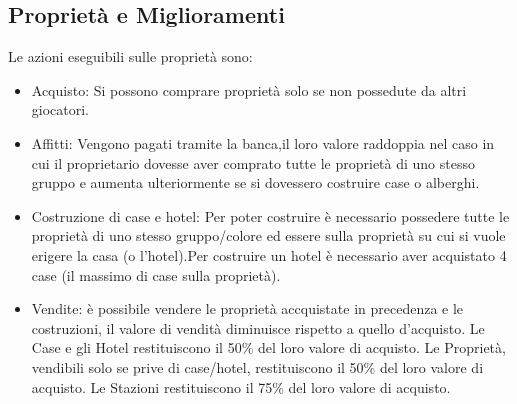\subsection{Proprietà e Miglioramenti}
Le azioni eseguibili sulle proprietà sono:
\begin{itemize}
    \item Acquisto: Si possono comprare proprietà solo se non possedute da altri giocatori.
    \item Affitti: Vengono pagati tramite la banca,\newline il loro valore raddoppia nel caso in cui il proprietario dovesse aver comprato tutte le proprietà di uno stesso gruppo e aumenta ulteriormente se si dovessero costruire case o alberghi.
    \item Costruzione di case e hotel: Per poter costruire è necessario possedere tutte le proprietà di uno stesso gruppo/colore ed essere sulla proprietà su cui si vuole erigere la casa (o l'hotel).\newline Per costruire un hotel è necessario aver acquistato 4 case (il massimo di case sulla proprietà).
    \item Vendite: è possibile vendere le proprietà accquistate in precedenza e le costruzioni, il valore di vendità diminuisce rispetto a quello d'acquisto.\newline
    Le Case e gli Hotel restituiscono il 50\% del loro valore di acquisto.\newline
    Le Proprietà, vendibili solo se prive di case/hotel, restituiscono il 50\% del loro valore di acquisto.\newline
    Le Stazioni restituiscono il 75\% del loro valore di acquisto.
\end{itemize}
